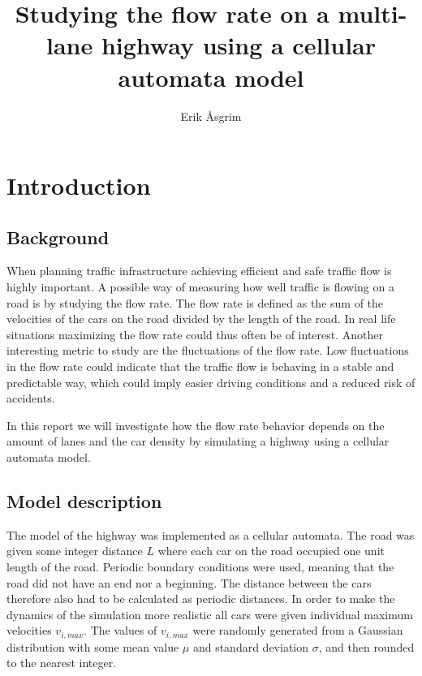 \documentclass[a4paper,12pt]{article}
\title{Studying the flow rate on a multi-lane highway using a cellular automata model}
\author{Erik Åsgrim}
\begin{document}
\maketitle

\section*{Introduction}
\subsection*{Background}
When planning traffic infrastructure achieving efficient and safe traffic flow is highly important.
A possible way of measuring how well traffic is flowing on a road is by studying the flow rate.
The flow rate is defined as the sum of the velocities of the cars on the road divided by the length of the road.
In real life situations maximizing the flow rate could thus often be of interest. Another interesting metric to study are the fluctuations of the 
flow rate. Low fluctuations in the flow rate could indicate that the traffic flow is behaving in a stable and predictable way, 
which could imply easier driving conditions and a reduced risk of accidents.

In this report we will investigate how the flow rate behavior depends on the amount of lanes and the car density by simulating
a highway using a cellular automata model.

\subsection*{Model description}
The model of the highway was implemented as a cellular automata. The road was given some integer distance $L$ where each car on the road occupied one unit length of the road. 
Periodic boundary conditions were used, meaning that the road did not have an end nor a beginning. The distance between the cars therefore also had to be calculated as periodic distances.
In order to make the dynamics of the simulation more realistic all cars were given individual maximum velocities $v_{i,max}$. The values of $v_{i, max}$ were randomly generated 
from a Gaussian distribution with some mean value $\mu$ and standard deviation $\sigma$, and then rounded to the nearest integer.
\end{document}
